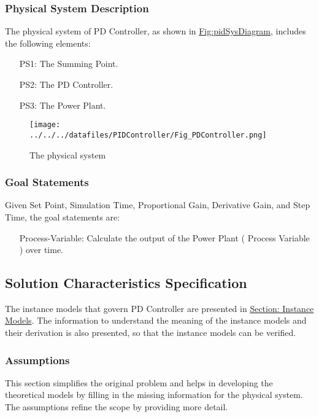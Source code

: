 \documentclass[12pt]{article}
\begin{document}
\subsubsection{Physical System Description}
\label{Sec:PhysSyst}
The physical system of PD Controller, as shown in \hyperref[Figure:pidSysDiagram]{Fig:pidSysDiagram}, includes the following elements:

\begin{itemize}
\item[PS1:]{The Summing Point.}
\item[PS2:]{The PD Controller.}
\item[PS3:]{The Power Plant.}
\end{itemize}
\begin{figure}
\begin{center}
\texttt{[image: ../../../datafiles/PIDController/Fig\_PDController.png]}
\caption{The physical system}
\label{Figure:pidSysDiagram}
\end{center}
\end{figure}
\subsubsection{Goal Statements}
\label{Sec:GoalStmt}
Given Set Point, Simulation Time, Proportional Gain, Derivative Gain, and Step Time, the goal statements are:

\begin{itemize}
\item[Process-Variable:\phantomsection\label{processVariable}]{Calculate the output of the Power Plant ( Process Variable ) over time.}
\end{itemize}
\subsection{Solution Characteristics Specification}
\label{Sec:SolCharSpec}
The instance models that govern PD Controller are presented in \hyperref[Sec:IMs]{Section: Instance Models}. The information to understand the meaning of the instance models and their derivation is also presented, so that the instance models can be verified.

\subsubsection{Assumptions}
\label{Sec:Assumps}
This section simplifies the original problem and helps in developing the theoretical models by filling in the missing information for the physical system. The assumptions refine the scope by providing more detail.
\end{document}
